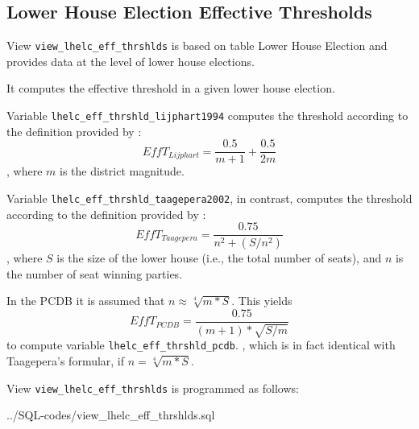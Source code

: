 \subsection{Lower House Election Effective Thresholds}\label{view_lhelc_eff_thrshld}
View \texttt{\footnotesize view\_lhelc\_eff\_thrshlds} is based on table Lower House Election and provides data at the level of lower house elections.


It computes the effective threshold in a given lower house election.

Variable \texttt{\footnotesize lhelc\_eff\_thrshld\_lijphart1994} computes the threshold according to the definition provided by \citet{Lijphart1994}: 
\begin{equation}\label{EffT_Lijphart_equation}
EffT_{Lijphart}=\frac{0.5}{m+1}+\frac{0.5}{2m} 
\end{equation}, where $m$ is the district magnitude.

Variable \texttt{\footnotesize lhelc\_eff\_thrshld\_taagepera2002}, in contrast, computes the threshold according to the definition provided by \citet[p.\,309]{Taagepera2002}: 
\begin{equation}\label{EffT_Taagepera_equation}
EffT_{Taagepera}=\frac{0.75}{n^{2}+(S/n^{2})}
\end{equation}, where $S$ is the size of the lower house (i.e., the total number of seats), and $n$ is the number of seat winning parties.

In the PCDB it is assumed that $n \approx \sqrt[4]{m*S}$. 
This yields
\begin{equation}\label{EffT_PCDB_equation}
EffT_{PCDB}=\frac{0.75}{(m+1)*\sqrt{S/m}}
\end{equation} to compute variable \texttt{\footnotesize lhelc\_eff\_thrshld\_pcdb}.
, which is in fact identical with Taagepera's formular, if $n = \sqrt[4]{m*S}$.


View \texttt{\footnotesize view\_lhelc\_eff\_thrshlds} is programmed as follows:

%
{../SQL-codes/view_lhelc_eff_thrshlds.sql}
